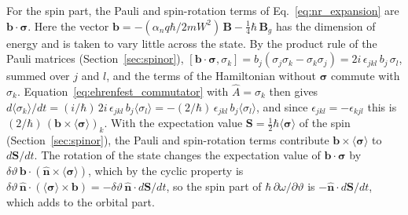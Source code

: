\documentclass[aps,prd,onecolumn,tightenlines,nofootinbib,notitlepage,11pt,floatfix]{revtex4-2}
\theoremstyle{indentedtheorem}
\begin{document}
For the spin part, the Pauli and spin-rotation terms of Eq.~\eqref{eq:nr_expansion} are $\mathbf{b}\cdot\boldsymbol{\sigma}$. Here the vector $\mathbf{b}=-(\alpha_nq\hbar/2mW^2)\,\mathbf{B}-\tfrac{1}{4}\hbar\,\mathbf{B}_g$ has the dimension of energy and is taken to vary little across the state. By the product rule of the Pauli matrices (Section~\ref{sec:spinor}), $[\mathbf{b}\cdot\boldsymbol{\sigma},\sigma_k]=b_j(\sigma_j\sigma_k-\sigma_k\sigma_j)=2i\,\epsilon_{jkl}\,b_j\,\sigma_l$, summed over $j$ and $l$, and the terms of the Hamiltonian without $\boldsymbol{\sigma}$ commute with $\sigma_k$. Equation~\eqref{eq:ehrenfest_commutator} with $\hat{A}=\sigma_k$ then gives $d\langle\sigma_k\rangle/dt=(i/\hbar)\,2i\,\epsilon_{jkl}\,b_j\langle\sigma_l\rangle=-(2/\hbar)\,\epsilon_{jkl}\,b_j\langle\sigma_l\rangle$, and since $\epsilon_{jkl}=-\epsilon_{kjl}$ this is $(2/\hbar)\,(\mathbf{b}\times\langle\boldsymbol{\sigma}\rangle)_k$. With the expectation value $\mathbf{S}=\tfrac{1}{2}\hbar\langle\boldsymbol{\sigma}\rangle$ of the spin (Section~\ref{sec:spinor}), the Pauli and spin-rotation terms contribute $\mathbf{b}\times\langle\boldsymbol{\sigma}\rangle$ to $d\mathbf{S}/dt$. The rotation of the state changes the expectation value of $\mathbf{b}\cdot\boldsymbol{\sigma}$ by $\delta\vartheta\,\mathbf{b}\cdot(\hat{\mathbf{n}}\times\langle\boldsymbol{\sigma}\rangle)$, which by the cyclic property is $\delta\vartheta\,\hat{\mathbf{n}}\cdot(\langle\boldsymbol{\sigma}\rangle\times\mathbf{b})=-\delta\vartheta\,\hat{\mathbf{n}}\cdot d\mathbf{S}/dt$, so the spin part of $\hbar\,\partial\omega/\partial\vartheta$ is $-\hat{\mathbf{n}}\cdot d\mathbf{S}/dt$, which adds to the orbital part.
\end{document}
